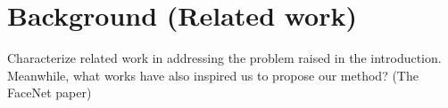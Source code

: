 \section{Background (Related work)}


{
\setlength{\parindent}{4em}
\color{gray} 

\indent Characterize related work in addressing the problem raised in the
introduction.  Meanwhile, what works have also inspired us to propose our method?  (The
FaceNet paper)

}
